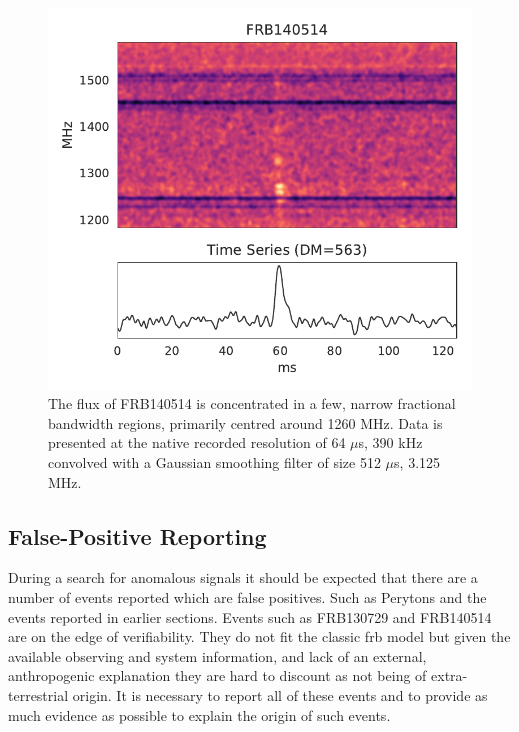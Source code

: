\documentclass[a4paper,fleqn,usenatbib]{mnras}
\begin{document}
\begin{figure}
    \includegraphics[width=1.0\linewidth]{figures/FRB140514.pdf}
    \caption{The flux of FRB140514 is concentrated in a few, narrow fractional
    bandwidth regions, primarily centred around 1260 MHz.  Data is presented at
    the native recorded resolution of 64 $\mu$s, 390 kHz convolved with a
    Gaussian smoothing filter of size 512 $\mu$s, 3.125 MHz.
    }
    \label{fig:FRB140514}
\end{figure}

\subsection{False-Positive Reporting}

During a search for anomalous signals it should be expected that there are a
number of events reported which are false positives. Such as Perytons
\citep{2011ApJ...727...18B} and the events reported in earlier sections. Events
such as FRB130729 and FRB140514 are on the edge of verifiability. They do not
fit the classic \gls{frb} model but given the available observing and system
information, and lack of an external, anthropogenic explanation they are hard
to discount as not being of extra-terrestrial origin. It is necessary to report
all of these events and to provide as much evidence as possible to explain the
origin of such events.
\end{document}

